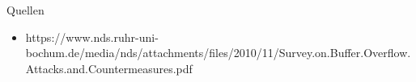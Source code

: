 \begin{frame}{Quellen}
    \begin{itemize}
        \item https://www.nds.ruhr-uni-bochum.de/media/nds/attachments/files/2010/11/Survey.on.Buffer.Overflow.Attacks.and.Countermeasures.pdf
    \end{itemize}
\end{frame}